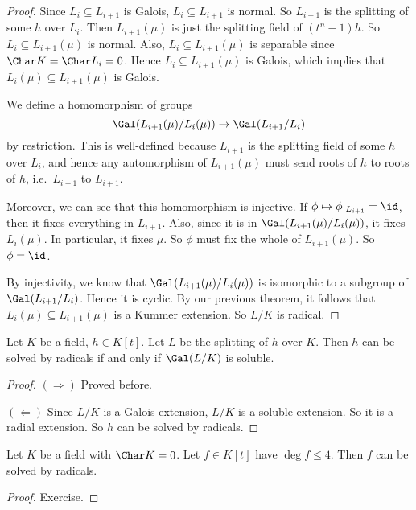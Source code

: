 \documentclass[a4paper]{article}
\begin{document}
\begin{proof}
  Since $L_i \subseteq L_{i + 1}$ is Galois, $L_i \subseteq L_{i + 1}$ is normal. So $L_{i + 1}$ is the splitting of some $h$ over $L_i$. Then $L_{i + 1}(\mu)$ is just the splitting field of $(t^n - 1) h$. So $L_i \subseteq L_{i + 1}(\mu)$ is normal. Also, $L_i \subseteq L_{i + 1}(\mu)$ is separable since $\Char K = \Char L_i = 0$. Hence $L_i \subseteq L_{i + 1}(\mu)$ is Galois, which implies that $L_i(\mu) \subseteq L_{i + 1}(\mu)$ is Galois.

  We define a homomorphism of groups
  \[
    \Gal(L_{i + 1}(\mu) / L_i (\mu)) \to \Gal(L_{i + 1}/L_i)
  \]
  by restriction. This is well-defined because $L_{i + 1}$ is the splitting field of some $h$ over $L_i$, and hence any automorphism of $L_{i + 1}(\mu)$ must send roots of $h$ to roots of $h$, i.e.\ $L_{i + 1}$ to $L_{i + 1}$.

  Moreover, we can see that this homomorphism is injective. If $\phi \mapsto \phi|_{L_{i + 1}} = \id$, then it fixes everything in $L_{i + 1}$. Also, since it is in $\Gal(L_{i + 1}(\mu)/L_i(\mu))$, it fixes $L_i(\mu)$. In particular, it fixes $\mu$. So $\phi$ must fix the whole of $L_{i + 1}(\mu)$. So $\phi = \id$.

  By injectivity, we know that $\Gal(L_{i + 1}(\mu)/L_i(\mu))$ is isomorphic to a subgroup of $\Gal(L_{i + 1}/L_i)$. Hence it is cyclic. By our previous theorem, it follows that $L_i(\mu) \subseteq L_{i + 1}(\mu)$ is a Kummer extension. So $L/K$ is radical.
\end{proof}

\begin{cor}
  Let $K$ be a field, $h \in K[t]$. Let $L$ be the splitting of $h$ over $K$. Then $h$ can be solved by radicals if and only if $\Gal(L/K)$ is soluble.
\end{cor}

\begin{proof}
  $(\Rightarrow)$ Proved before.

  $(\Leftarrow)$ Since $L/K$ is a Galois extension, $L/K$ is a soluble extension. So it is a radial extension. So $h$ can be solved by radicals.
\end{proof}

\begin{cor}
  Let $K$ be a field with $\Char K = 0$. Let $f \in K[t]$ have $\deg f \leq 4$. Then $f$ can be solved by radicals.
\end{cor}

\begin{proof}
  Exercise.
\end{proof}
\end{document}

